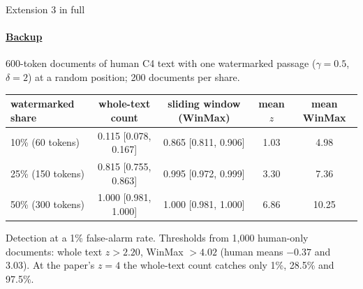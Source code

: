 \documentclass[aspectratio=169,10pt,t]{beamer}
\begin{document}
\begin{frame}[label=b19]{Extension 3 in full}
  \framesubtitle{\hyperlink{b0}{Backup}}
  600-token documents of human C4 text with one watermarked passage ($\gamma = 0.5$, $\delta = 2$) at a random position; 200 documents per share.
  \vspace{0.5em}
  \begin{center}
  \small
  \begin{tabular}{@{}lcccc@{}}
    \toprule
    watermarked share & whole-text count & sliding window (WinMax) & mean $z$ & mean WinMax \\
    \midrule
    10\% (60 tokens) & 0.115 [0.078, 0.167] & 0.865 [0.811, 0.906] & 1.03 & 4.98 \\
    25\% (150 tokens) & 0.815 [0.755, 0.863] & 0.995 [0.972, 0.999] & 3.30 & 7.36 \\
    50\% (300 tokens) & 1.000 [0.981, 1.000] & 1.000 [0.981, 1.000] & 6.86 & 10.25 \\
    \bottomrule
  \end{tabular}
  \end{center}
  \vspace{0.5em}
  Detection at a 1\% false-alarm rate. Thresholds from 1{,}000 human-only documents: whole text $z > 2.20$, WinMax $> 4.02$ (human means $-0.37$ and 3.03). At the paper's $z = 4$ the whole-text count catches only 1\%, 28.5\% and 97.5\%.
\end{frame}
\end{document}

